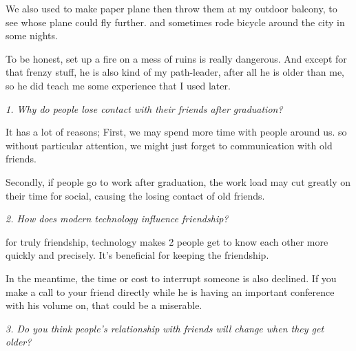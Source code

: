 \documentclass[conference]{IEEEtran}
\begin{document}
We also used to make paper plane then throw them at my outdoor balcony, to see whose plane could fly further.
and sometimes rode bicycle around the city in some nights. 

To be honest, set up a fire on a mess of ruins is really dangerous. And except for that frenzy stuff,
he is also kind of my path-leader, after all he is older than me, so he did teach me some experience
that I used later.

\textit{1. Why do people lose contact with their friends after graduation?}

It has a lot of reasons;
First, we may spend more time with people around us. so without particular attention,
we might just forget to communication with old friends.

Secondly, if people go to work after graduation, the work load may cut greatly on their time
for social, causing the losing contact of old friends.

\textit{2. How does modern technology influence friendship?}

for truly friendship, technology makes 2 people get to know each other more quickly and precisely.
It's beneficial for keeping the friendship.

In the meantime, the time or cost to interrupt someone is also declined. If you make a call to your
friend directly while he is having an important conference with his volume on, that could be a miserable.

\textit{3. Do you think people's relationship with friends will change when they get older?}
\end{document}
